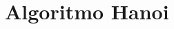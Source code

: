 \section[Algoritmo Hanoi]{Algoritmo Hanoi}
\begin{frame}[plain]
%	
%	
%		
		
\end{frame}

		
\begin{frame}[plain]
%	
%	
	
\end{frame}	